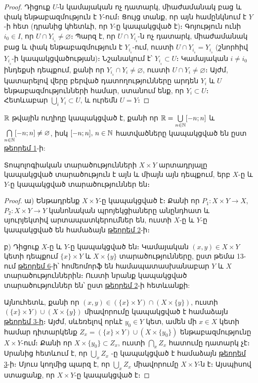 \documentclass[./main.tex]{subfiles}
\begin{document}
\begin{proof}
Դիցուք $U$-ն կամայական ոչ դատարկ, միաժամանակ բաց և փակ ենթա\-բազ\-մութ\-յուն է $Y$-ում։ Ցույց տանք, որ այն համընկնում է $Y$-ի հետ (դրանից կհետևի, որ $Y$-ը կապակցված է)։ Գոյություն ունի $i_0 \in I$, որ $U \cap Y_{i_{_0}} \neq \varnothing$։ Պարզ է, որ $U \cap Y_{i_{_0}}$-ն ոչ դատարկ, միաժամանակ բաց և փակ ենթաբազմություն է $Y_{i_{_0}}$-ում, ուստի $U \cap Y_{i_{_0}}=Y_{i_{_0}}$ (շնորհիվ $Y_{i_{_0}}$-ի կապակցվածության)։ Նշանակում է՝ $Y_{i_{_0}} \subset U$։ Կամայական $i \neq i_0$ ինդեքսի դեպքում, քանի որ $Y_{i_{_0}} \cap Y_i \neq \varnothing$, ուստի $U \cap Y_{i} \neq \varnothing$։ Այժմ, կատարելով վերը բերված դատողությունները արդեն $Y_i$ և $U$ ենթաբազմությունների համար, ստանում ենք, որ $Y_i \subset U$։ Հետևաբար $\bigcup\limits_i Y_i \subset U$, և ուրեմն $U=Y$։
\end{proof} 

\begin{hetevanq}\label{ch14cor2}
$\mathbb{R}$ թվային ուղիղը կապակցված է, քանի որ $\mathbb{R}= \bigcup\limits_{n \in \mathbb{N}} [-n;n]$ և ${\bigcap\limits_{n \in \mathbb{N}} [-n;n] \neq \varnothing}$, իսկ $[-n;n],\, n \in \mathbb{N}$ հատվածները կապակցված են ըստ \hyperref[15:թեորեմ1]{թեորեմ 1}-ի:
\end{hetevanq}

\begin{theorem}\label{ch14thm4}
\label{15:թեորեմ4}
Տոպոլոգիական տարածությունների $X \times Y$ արտադրյալը կապակց\-ված տարածություն է այն և միայն այն դեպքում, երբ $X$-ը և $Y$-ը կապակցված տարա\-ծություններ են։
\end{theorem}

\begin{proof}
 ա) Ենթադրենք $X \times Y$-ը կապակցված է։ Քանի որ $P_1:{X \times Y \rightarrow X}$, $P_2:X \times Y \rightarrow Y$ կանոնական պրոյեկցիաները անընդհատ և սյուրյեկտիվ արտա\-պատ\-կերում\-ներ են, ուստի $X$-ը և $Y$-ը կապակցված են համաձայն \hyperref[15:թեորեմ 2]{թեորեմ 2}-ի։
\par բ) Դիցուք $X$-ը և $Y$-ը կապակցված են։ Կամայական $(x,y) \in X \times Y$ կետի դեպքում $\{x\} \times Y$ և $X \times \{y\}$ տարածությունները, ըստ թեմա 13-ում \hyperref[ch13thm6]{թեորեմ 6}-ի՝ հոմեոմորֆ են համապատասխանաբար $Y$ և $X$ տարածություններին։ Ուստի նրանք կապակցված տարածություններ են՝ ըստ \hyperref[15:թեորեմ 2]{թեորեմ 2}-ի հետևանքի:
\par Այնուհետև, քանի որ $(x,y) \in (\{x\} \times Y) \cap (X \times \{y\})$, ուստի $(\{x\} \times Y) \cup (X\times \{y\})$ միավորումը կապակցված է համաձայն \hyperref[15:թեորեմ 3]{թեորեմ 3-ի}։ Այժմ, սևեռելով որևէ $y_0 \in Y$ կետ, ամեն մի $x \in X$ կետի համար դիտարկենք $Z_x=(\{x\} \times Y) \cup (X\times \{y_0\})$ ենթա\-բազմությունը $X \times Y$-ում։ Քանի որ $X \times \{y_0\} \subset Z_x$, ուստի $\bigcap\limits_x Z_x$  հատումը դա\-տարկ չէ։ Սրանից հետևում է, որ $\bigcup\limits_x Z_x$ -ը կապակցված է համաձայն \hyperref[15:թեորեմ 3]{թեորեմ 3}-ի։ Մյուս կողմից պարզ է, որ $\bigcup\limits_x Z_x$ միավորումը $X \times Y$-ն է։ Այսպիսով ստացանք, որ $X \times Y$-ը կապակցված է։
\end{proof}
\end{document}
